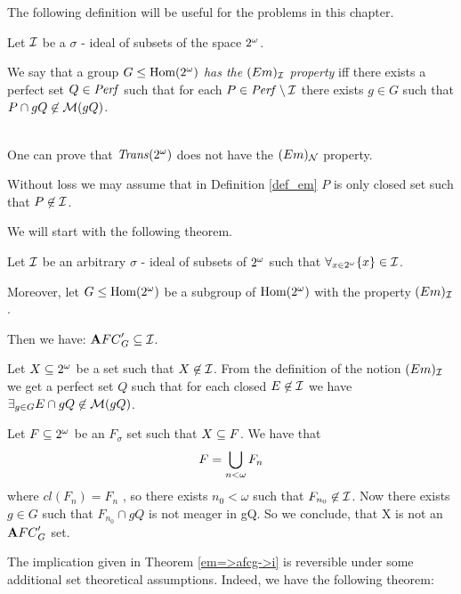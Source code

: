 The following definition will be useful for the problems in this chapter.

\begin{definition}
\label{def_em}
Let ${\cal I}$ be a $\sigma$ - ideal of subsets of the space $2^{\omega}$.

We say that a group $G \leq {\rm Hom(2^{\omega})}$ {\it has the $(Em)_{{\cal I}}$ property}\/
iff there exists a perfect set $Q \in {\it Perf}$
such that for each
$P\in {\it Perf} \setminus {\cal I}$
there exists $g \in G$ such that
$P \cap gQ \not\in {\cal M}(gQ)$.
\end{definition}

 \\

One can prove that ${\it Trans}(2^{\omega})$ does not have the $(Em)_{{\cal N}}$ property.

Without loss we may assume that in Definition \ref{def_em}
$P$ is only closed set such that $P \not\in {\cal I}$.

We will start with the following theorem.

\begin{theorem}
\label{em=>afcg->i}
  Let ${\cal I}$ be an arbitrary $\sigma$ - ideal of subsets of $2^{\omega}$
such that $\forall_{x\in2^{\omega}} \lbrace x \rbrace \in {\cal I}$.

  Moreover, let $G \leq {\rm Hom(2^{\omega})}$
be a subgroup of ${\rm Hom(2^{\omega})}$ with the property $(Em)_{{\cal I}}$.

  Then we have:
${\mathbf AFC}^\prime_{G} \subseteq {\cal I}$.
\end{theorem}

\proof

Let $X \subseteq 2^{\omega}$ be a set such that $X \not\in {\cal I}$.
From the definition of
the notion $(Em)_{{\cal I}}$ we get a perfect set $Q$ such that
for each closed $E \not\in {\cal I}$ we have
$\exists_{g \in G} E \cap gQ \not\in {\cal M}(gQ)$.

Let $F \subseteq 2^{\omega}$ be an $F_{\sigma}$ set
such that $X \subseteq F$.
We have that
$$F = \bigcup_{ n < \omega } F_n$$
where $cl(F_n) = F_n$ , so there exists $n_0 < \omega$
such that $F_{n_0} \not\in {\cal I}$.
Now there exists $g \in G$
such that $F_{n_0} \cap gQ$
is not meager in gQ.
So we conclude, that X is not an ${\mathbf AFC}^\prime_{G}$ set.

\bigskip

The implication given in Theorem \ref{em=>afcg->i} is reversible
under some additional set theoretical assumptions.
Indeed, we have the following theorem:

